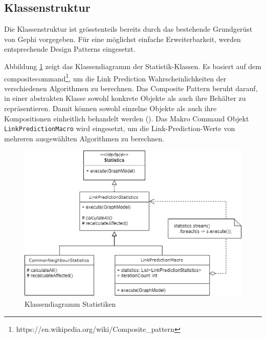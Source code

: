 \subsection{Klassenstruktur}
Die Klassenstruktur ist grösstenteils bereits durch das bestehende Grundgerüst von Gephi vorgegeben. Für eine möglichst einfache Erweiterbarkeit, werden entsprechende Design Patterns eingesetzt.

Abbildung \ref{fig:class_statistic} zeigt das Klassendiagramm der Statistik-Klassen. Es basiert auf dem \acs{compositecommand}\footnote{https://en.wikipedia.org/wiki/Composite\_pattern}, um die Link Prediction Wahrscheinlichkeiten der verschiedenen Algorithmen zu berechnen. Das Composite Pattern beruht darauf, in einer abstrakten Klasse sowohl konkrete Objekte als auch ihre Behälter zu repräsentieren. Damit können sowohl einzelne Objekte als auch ihre Kompositionen einheitlich behandelt werden (\cite{wikipedia_kompositum_2019}). Das Makro Command Objekt \texttt{LinkPredictionMacro} wird eingesetzt, um die Link-Prediction-Werte von mehreren ausgewählten Algorithmen zu berechnen.
\begin{figure}[!b]
    \centering
    \includegraphics[width=\linewidth]{resources/class_Statistic.png}
    \caption{Klassendiagramm Statistiken}
    \label{fig:class_statistic}
\end{figure}

